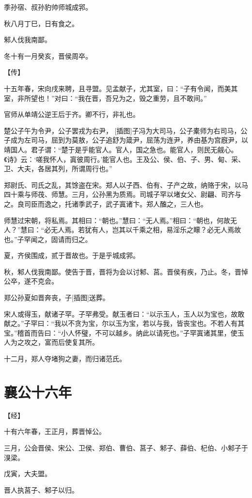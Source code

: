 \documentclass[a4paper,12pt,UTF8,twoside]{ctexbook}
\begin{document}
季孙宿、叔孙豹帅师城成郛。

秋八月丁巳，日有食之。

邾人伐我南鄙。

冬十有一月癸亥，晋侯周卒。

【传】

十五年春，宋向戌来聘，且寻盟。见孟献子，尤其室，曰：“子有令闻，而美其室，非所望也！”对曰：“我在晋，吾兄为之，毁之重劳，且不敢间。”

官师从单靖公逆王后于齐。卿不行，非礼也。

楚公子午为令尹，公子罢戎为右尹， [插图]子冯为大司马，公子橐师为右司马，公子成为左司马，屈到为莫敖，公子追舒为箴尹，屈荡为连尹，养由基为宫廐尹，以靖国人。君子谓：“楚于是乎能官人。官人，国之急也。能官人，则民无觎心。《诗》云：‘嗟我怀人，寘彼周行。’能官人也。王及公、侯、伯、子、男、甸、采、卫、大夫，各居其列，所谓周行也。”

郑尉氏、司氏之乱，其馀盗在宋。郑人以子西、伯有、子产之故，纳赂于宋，以马四十乘与师茷、师慧。三月，公孙黑为质焉。司城子罕以堵女父、尉翩、司齐与之。良司臣而逸之，托诸季武子，武子寘诸卞。郑人醢之，三人也。

师慧过宋朝，将私焉。其相曰：“朝也。”慧曰：“无人焉。”相曰：“朝也，何故无人？”慧曰：“必无人焉。若犹有人，岂其以千乘之相，易淫乐之矇？必无人焉故也。”子罕闻之，固请而归之。

夏，齐侯围成，贰于晋故也。于是乎城成郛。

秋，邾人伐我南鄙。使告于晋，晋将为会以讨邾、莒。晋侯有疾，乃止。冬，晋悼公卒，遂不克会。

郑公孙夏如晋奔丧，子[插图]送葬。

宋人或得玉，献诸子罕。子罕弗受。献玉者曰：“以示玉人，玉人以为宝也，故敢献之。”子罕曰：“我以不贪为宝，尔以玉为宝，若以与我，皆丧宝也。不若人有其宝。”稽首而告曰：“小人怀璧，不可以越乡。纳此以请死也。”子罕寘诸其里，使玉人为之攻之，富而后使复其所。

十二月，郑人夺堵狗之妻，而归诸范氏。

\section{襄公十六年}


【经】

十有六年春，王正月，葬晋悼公。

三月，公会晋侯、宋公、卫侯、郑伯、曹伯、莒子、邾子、薛伯、杞伯、小邾子于湨梁。

戊寅，大夫盟。

晋人执莒子、邾子以归。
\end{document}
